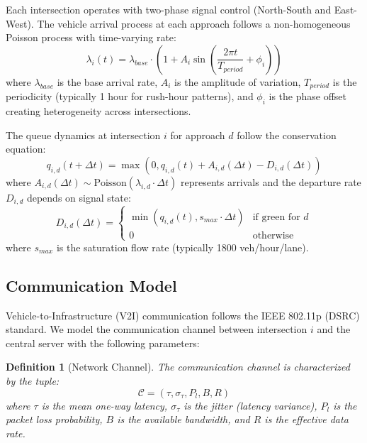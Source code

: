 \documentclass[conference]{IEEEtran}
\newtheorem{definition}{Definition}
\begin{document}
Each intersection operates with two-phase signal control (North-South and East-West). The vehicle arrival process at each approach follows a non-homogeneous Poisson process with time-varying rate:
\begin{equation}
\lambda_i(t) = \lambda_{base} \cdot \left(1 + A_i \sin\left(\frac{2\pi t}{T_{period}} + \phi_i\right)\right)
\end{equation}
where $\lambda_{base}$ is the base arrival rate, $A_i$ is the amplitude of variation, $T_{period}$ is the periodicity (typically 1 hour for rush-hour patterns), and $\phi_i$ is the phase offset creating heterogeneity across intersections.

The queue dynamics at intersection $i$ for approach $d$ follow the conservation equation:
\begin{equation}
q_{i,d}(t+\Delta t) = \max\left(0, q_{i,d}(t) + A_{i,d}(\Delta t) - D_{i,d}(\Delta t)\right)
\end{equation}
where $A_{i,d}(\Delta t) \sim \text{Poisson}(\lambda_{i,d} \cdot \Delta t)$ represents arrivals and the departure rate $D_{i,d}$ depends on signal state:
\begin{equation}
D_{i,d}(\Delta t) = \begin{cases}
\min(q_{i,d}(t), s_{max} \cdot \Delta t) & \text{if green for } d \\
0 & \text{otherwise}
\end{cases}
\end{equation}
where $s_{max}$ is the saturation flow rate (typically 1800 veh/hour/lane).

\subsection{Communication Model}
Vehicle-to-Infrastructure (V2I) communication follows the IEEE 802.11p (DSRC) standard. We model the communication channel between intersection $i$ and the central server with the following parameters:

\begin{definition}[Network Channel]
The communication channel is characterized by the tuple:
\begin{equation}
\mathcal{C} = (\tau, \sigma_\tau, P_l, B, R)
\end{equation}
where $\tau$ is the mean one-way latency, $\sigma_\tau$ is the jitter (latency variance), $P_l$ is the packet loss probability, $B$ is the available bandwidth, and $R$ is the effective data rate.
\end{definition}
\end{document}
